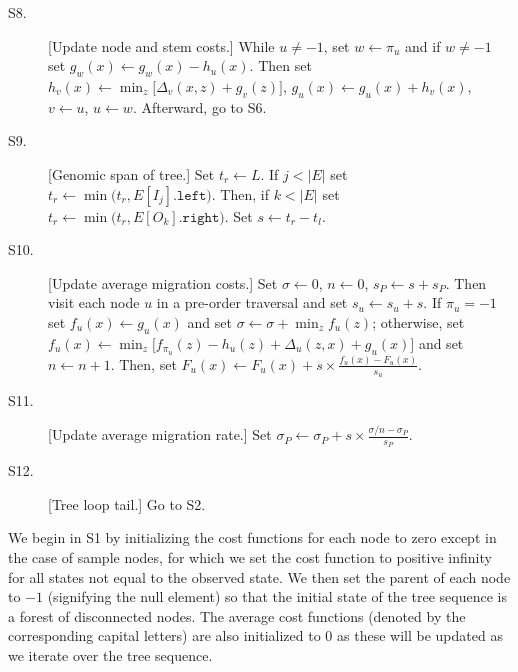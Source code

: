 \begin{description}
\item[S8.] [Update node and stem costs.]
    While $u \neq -1$,
        set $w \leftarrow \pi_u$ and
        if $w \neq -1$
            set $g_w(x) \leftarrow g_w(x) - h_u(x)$.
        Then
        set $h_v(x) \leftarrow \min_{z}\bigl[\Delta_v(x,z) + g_v(z)\bigr]$,
        $g_u(x) \leftarrow g_u(x) + h_v(x)$,
        $v \leftarrow u$, $u \leftarrow w$.
    Afterward, go to S6.

\item[S9.] [Genomic span of tree.]
    Set $t_r \leftarrow L$.
    If $j < |E|$ set
        $t_r \leftarrow \min\bigl(t_r, E[I_j].\texttt{left}\bigr)$.
    Then,
    if $k < |E|$ set
        $t_r \leftarrow \min\bigl(t_r, E[O_k].\texttt{right}\bigr)$.
    Set $s \leftarrow t_r - t_l$.

\item[S10.] [Update average migration costs.]
    Set $\sigma \leftarrow 0$, $n \leftarrow 0$, $s_P \leftarrow s + s_P$.
    Then visit each node $u$ in a pre-order traversal and set
    $s_u \leftarrow s_u + s$.
    If $\pi_u = -1$ set
        $f_u(x) \leftarrow g_u(x)$ and set
        $\sigma \leftarrow \sigma + \min_z f_u(z)$;
    otherwise, set 
        $f_u(x) \leftarrow \min_z \bigl[ f_{\pi_u}(z) - h_u(z) + \Delta_u(z,x) + g_u(x) \bigr]$
        and set $n \leftarrow n + 1$.
    Then, set
        $F_u(x) \leftarrow F_u(x) + s \times \frac{f_u(x) - F_u(x)}{s_u}$.

\item[S11.] [Update average migration rate.]
    Set $\sigma_P \leftarrow \sigma_P + s \times \frac{\sigma/n - \sigma_P}{s_P}$.

\item[S12.] [Tree loop tail.]
    Go to S2.

\end{description}

We begin in S1 by initializing the cost functions for each node to zero except in
the case of sample nodes, for which we set the cost function to positive infinity for all states
not equal to the observed state. We then set the parent of each node to $-1$ 
(signifying the null element) so that the initial state of the tree sequence
is a forest of disconnected nodes. The average cost functions (denoted by the
corresponding capital letters) are also initialized to $0$ as these will be
updated as we iterate over the tree sequence.

